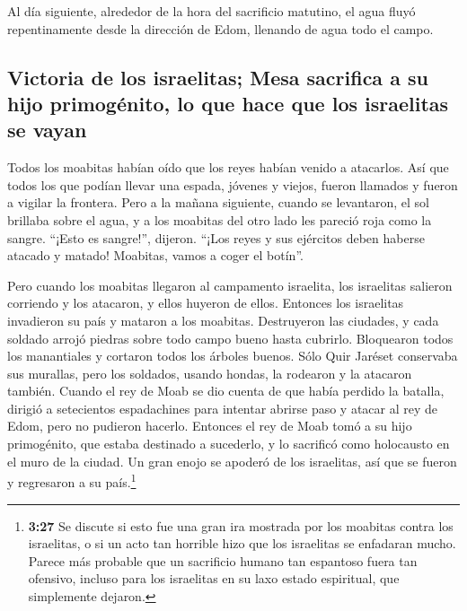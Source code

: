  Al día siguiente, alrededor de la hora del sacrificio
matutino, el agua fluyó repentinamente desde la dirección de Edom,
llenando de agua todo el campo.

\hypertarget{victoria-de-los-israelitas-mesa-sacrifica-a-su-hijo-primoguxe9nito-lo-que-hace-que-los-israelitas-se-vayan}{%
\subsection{Victoria de los israelitas; Mesa sacrifica a su hijo
primogénito, lo que hace que los israelitas se
vayan}\label{victoria-de-los-israelitas-mesa-sacrifica-a-su-hijo-primoguxe9nito-lo-que-hace-que-los-israelitas-se-vayan}}

 Todos los moabitas habían oído que los reyes habían
venido a atacarlos. Así que todos los que podían llevar una espada,
jóvenes y viejos, fueron llamados y fueron a vigilar la frontera.
 Pero a la mañana siguiente, cuando se levantaron, el sol
brillaba sobre el agua, y a los moabitas del otro lado les pareció roja
como la sangre.  ``¡Esto es sangre!'', dijeron. ``¡Los
reyes y sus ejércitos deben haberse atacado y matado! Moabitas, vamos a
coger el botín''.

 Pero cuando los moabitas llegaron al campamento
israelita, los israelitas salieron corriendo y los atacaron, y ellos
huyeron de ellos. Entonces los israelitas invadieron su país y mataron a
los moabitas.  Destruyeron las ciudades, y cada soldado
arrojó piedras sobre todo campo bueno hasta cubrirlo. Bloquearon todos
los manantiales y cortaron todos los árboles buenos. Sólo Quir Jaréset
conservaba sus murallas, pero los soldados, usando hondas, la rodearon y
la atacaron también.  Cuando el rey de Moab se dio cuenta
de que había perdido la batalla, dirigió a setecientos espadachines para
intentar abrirse paso y atacar al rey de Edom, pero no pudieron hacerlo.
 Entonces el rey de Moab tomó a su hijo primogénito, que
estaba destinado a sucederlo, y lo sacrificó como holocausto en el muro
de la ciudad. Un gran enojo se apoderó de los israelitas, así que se
fueron y regresaron a su país.\footnote{\textbf{3:27} Se discute si esto
  fue una gran ira mostrada por los moabitas contra los israelitas, o si
  un acto tan horrible hizo que los israelitas se enfadaran mucho.
  Parece más probable que un sacrificio humano tan espantoso fuera tan
  ofensivo, incluso para los israelitas en su laxo estado espiritual,
  que simplemente dejaron.}

